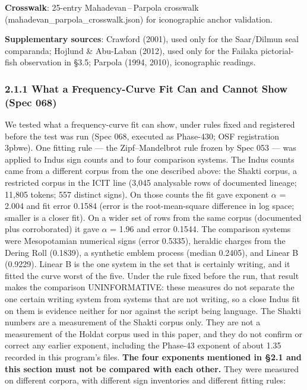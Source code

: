 \documentclass[
]{article}
\begin{document}
\textbf{Crosswalk}: 25-entry Mahadevan\,--\,Parpola crosswalk
(mahadevan\_parpola\_crosswalk.json) for iconographic anchor validation.

\textbf{Supplementary sources}: Crawford (2001), used only for the Saar/Dilmun seal comparanda; Hojlund \& Abu-Laban (2012), used only for the Failaka pictorial-fish observation in §3.5; Parpola (1994, 2010), iconographic readings.

\subsubsection{2.1.1 What a Frequency-Curve Fit Can and Cannot Show (Spec 068)}\label{what-a-frequency-curve-fit-can-and-cannot-show-spec-068}

We tested what a frequency-curve fit can show, under rules fixed and registered before the test was run (Spec 068, executed as Phase-430; OSF registration 3pbwe). One fitting rule --- the Zipf--Mandelbrot rule frozen by Spec 053 --- was applied to Indus sign counts and to four comparison systems. The Indus counts came from a different corpus from the one described above: the Shakti corpus, a restricted corpus in the ICIT line (3,045 analysable rows of documented lineage; 11,805 tokens; 557 distinct signs). On those counts the fit gave exponent $\alpha$ = 2.004 and fit error 0.1584 (error is the root-mean-square difference in log space; smaller is a closer fit). On a wider set of rows from the same corpus (documented plus corroborated) it gave $\alpha$ = 1.96 and error 0.1544. The comparison systems were Mesopotamian numerical signs (error 0.5335), heraldic charges from the Dering Roll (0.1839), a synthetic emblem process (median 0.2405), and Linear B (0.9229). Linear B is the one system in the set that is certainly writing, and it fitted the curve worst of the five. Under the rule fixed before the run, that result makes the comparison UNINFORMATIVE: these measures do not separate the one certain writing system from systems that are not writing, so a close Indus fit on them is evidence neither for nor against the script being language. The Shakti numbers are a measurement of the Shakti corpus only. They are not a measurement of the Holdat corpus used in this paper, and they do not confirm or correct any earlier exponent, including the Phase-43 exponent of about 1.35 recorded in this program's files. \textbf{The four exponents mentioned in §2.1 and this section must not be compared with each other.} They were measured on different corpora, with different sign inventories and different fitting rules:
\end{document}
